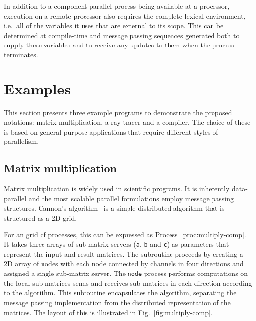\documentclass[11pt, conference, compsocconf, onecolumn]{IEEEtran}
\newcommand{\ttt}[1]{\texttt{#1}}
\newcommand{\fig}[1]{Fig.~\ref{fig:#1}}
\newcommand{\proc}[1]{Process~\ref{proc:#1}}
\newcounter{process}
\begin{document}
In addition to a component parallel process being available at a processor,
execution on a remote processor also requires the complete lexical environment,
i.e.\ all of the variables it uses that are external to its scope. This can be
determined at compile-time and message passing sequences generated both to
supply these variables and to receive any updates to them when the process
terminates. 

\section{Examples\label{sec:examples}}

This section presents three example programs to demonstrate the proposed
notations: matrix multiplication, a ray tracer and a compiler. The choice of
these is based on general-purpose applications that require different styles of
parallelism.

\subsection{Matrix multiplication\label{sec:matrix-multiply}}

Matrix multiplication is widely used in scientific programs. It is inherently
data-parallel and the most scalable parallel formulations employ message
passing structures.  Cannon's algorithm~\cite{Cannon69} is a simple distributed
algorithm that is structured as a 2D grid.

For an  grid of processes, this can be expressed as
\proc{multiply-comp}.  It takes three arrays of sub-matrix servers (\ttt{a},
\ttt{b} and \ttt{c}) as parameters that represent the input and result
matrices. The subroutine proceeds by creating a 2D array of nodes with each
node connected by channels in four directions and assigned a single sub-matrix
server.  The \ttt{node} process performs computations on the local sub matrices
sends and receives sub-matrices in each direction according to the algorithm.
This subroutine encapsulates the algorithm, separating the message passing
implementation from the distributed representation of the matrices. The layout
of this is illustrated in \fig{multiply-comp}. 
\end{document}
